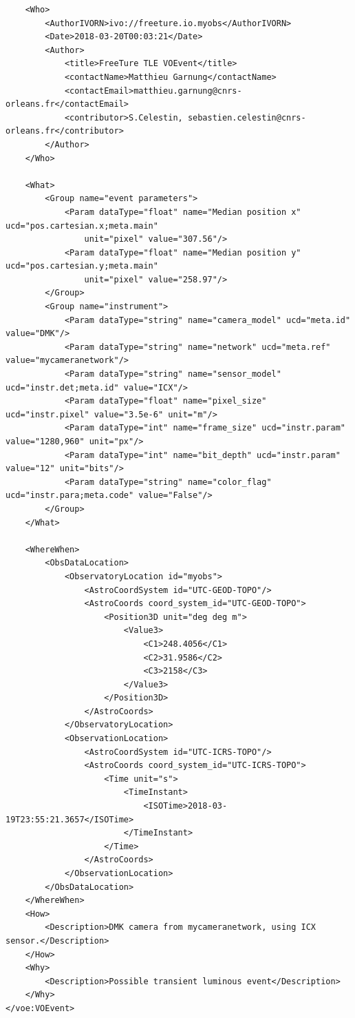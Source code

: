 \documentclass[referee,a4paper,12pt,traditabstract]{swsc}
\begin{document}
\begin{linenumbers}
{\begin{verbatim}
    <Who>
        <AuthorIVORN>ivo://freeture.io.myobs</AuthorIVORN>
        <Date>2018-03-20T00:03:21</Date>
        <Author>
            <title>FreeTure TLE VOEvent</title>
            <contactName>Matthieu Garnung</contactName>
            <contactEmail>matthieu.garnung@cnrs-orleans.fr</contactEmail>
            <contributor>S.Celestin, sebastien.celestin@cnrs-orleans.fr</contributor>
        </Author>
    </Who>

    <What>
        <Group name="event parameters">
            <Param dataType="float" name="Median position x" ucd="pos.cartesian.x;meta.main"
                unit="pixel" value="307.56"/>
            <Param dataType="float" name="Median position y" ucd="pos.cartesian.y;meta.main"
                unit="pixel" value="258.97"/>
        </Group>
        <Group name="instrument">
            <Param dataType="string" name="camera_model" ucd="meta.id" value="DMK"/>
            <Param dataType="string" name="network" ucd="meta.ref" value="mycameranetwork"/>
            <Param dataType="string" name="sensor_model" ucd="instr.det;meta.id" value="ICX"/>
            <Param dataType="float" name="pixel_size" ucd="instr.pixel" value="3.5e-6" unit="m"/>
            <Param dataType="int" name="frame_size" ucd="instr.param" value="1280,960" unit="px"/>
            <Param dataType="int" name="bit_depth" ucd="instr.param" value="12" unit="bits"/>
            <Param dataType="string" name="color_flag" ucd="instr.para;meta.code" value="False"/>
        </Group>
    </What>

    <WhereWhen>
        <ObsDataLocation>
            <ObservatoryLocation id="myobs">
                <AstroCoordSystem id="UTC-GEOD-TOPO"/>
                <AstroCoords coord_system_id="UTC-GEOD-TOPO">
                    <Position3D unit="deg deg m">
                        <Value3>
                            <C1>248.4056</C1>
                            <C2>31.9586</C2>
                            <C3>2158</C3>
                        </Value3>
                    </Position3D>
                </AstroCoords>
            </ObservatoryLocation>
            <ObservationLocation>
                <AstroCoordSystem id="UTC-ICRS-TOPO"/>
                <AstroCoords coord_system_id="UTC-ICRS-TOPO">
                    <Time unit="s">
                        <TimeInstant>
                            <ISOTime>2018-03-19T23:55:21.3657</ISOTime>
                        </TimeInstant>
                    </Time>
                </AstroCoords>
            </ObservationLocation>
        </ObsDataLocation>
    </WhereWhen>
    <How>
        <Description>DMK camera from mycameranetwork, using ICX sensor.</Description>
    </How>
    <Why>
        <Description>Possible transient luminous event</Description>
    </Why>
</voe:VOEvent>
\end{verbatim}
}


\end{linenumbers}
\end{document}

